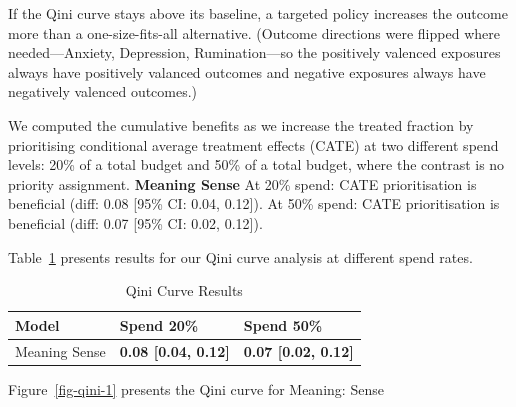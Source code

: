 \documentclass[
  single column]{article}
\begin{document}
If the Qini curve stays above its baseline, a targeted policy increases
the outcome more than a one-size-fits-all alternative. (Outcome
directions were flipped where needed---Anxiety, Depression,
Rumination---so the positively valenced exposures always have positively
valanced outcomes and negative exposures always have negatively valenced
outcomes.)

We computed the cumulative benefits as we increase the treated fraction
by prioritising conditional average treatment effects (CATE) at two
different spend levels: 20\% of a total budget and 50\% of a total
budget, where the contrast is no priority assignment. \textbf{Meaning
Sense} At 20\% spend: CATE prioritisation is beneficial (diff: 0.08
{[}95\% CI: 0.04, 0.12{]}). At 50\% spend: CATE prioritisation is
beneficial (diff: 0.07 {[}95\% CI: 0.02, 0.12{]}).

Table~\ref{tbl-qini} presents results for our Qini curve analysis at
different spend rates.

\begin{longtable}[]{@{}lll@{}}

\caption{\label{tbl-qini}Qini Curve Results}

\tabularnewline

\toprule\noalign{}
Model & Spend 20\% & Spend 50\% \\
\midrule\noalign{}
\endhead
\bottomrule\noalign{}
\endlastfoot
Meaning Sense & \textbf{0.08 {[}0.04, 0.12{]}} & \textbf{0.07 {[}0.02,
0.12{]}} \\

\end{longtable}

Figure~\ref{fig-qini-1} presents the Qini curve for Meaning: Sense
\end{document}
